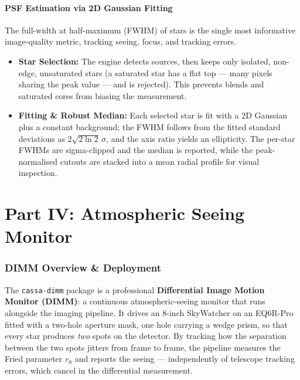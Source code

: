 \documentclass[11pt,a4paper]{article}
\begin{document}
\subsection{PSF Estimation via 2D Gaussian Fitting}\label{app:psf}
The full-width at half-maximum (FWHM) of stars is the single most informative image-quality metric, tracking seeing, focus, and tracking errors.
\begin{itemize}[leftmargin=*]
    \item \textbf{Star Selection:} The engine detects sources, then keeps only isolated, non-edge, unsaturated stars (a saturated star has a flat top --- many pixels sharing the peak value --- and is rejected). This prevents blends and saturated cores from biasing the measurement.
    \item \textbf{Fitting \& Robust Median:} Each selected star is fit with a 2D Gaussian plus a constant background; the FWHM follows from the fitted standard deviations as $2\sqrt{2\ln 2}\,\sigma$, and the axis ratio yields an ellipticity. The per-star FWHMs are sigma-clipped and the median is reported, while the peak-normalised cutouts are stacked into a mean radial profile for visual inspection.
\end{itemize}

\newpage

\part*{Part IV: Atmospheric Seeing Monitor}

\section{DIMM Overview \& Deployment}
The \texttt{cassa-dimm} package is a professional \textbf{Differential Image Motion Monitor (DIMM)}: a continuous atmospheric-seeing monitor that runs alongside the imaging pipeline. It drives an 8-inch SkyWatcher on an EQ6R-Pro fitted with a two-hole aperture mask, one hole carrying a wedge prism, so that every star produces \emph{two} spots on the detector. By tracking how the separation between the two spots jitters from frame to frame, the pipeline measures the Fried parameter $r_0$ and reports the seeing --- independently of telescope tracking errors, which cancel in the differential measurement.
\end{document}
